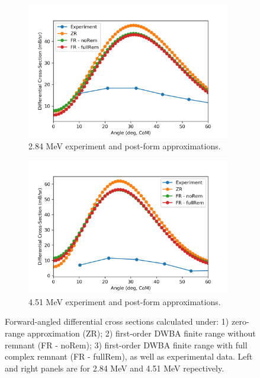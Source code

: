  \begin{figure}[h]
    \begin{subfigure}{0.5\textwidth}
		\centering
		\includegraphics[width=0.98\textwidth]{3MeVReactions.png}
		\caption{2.84 MeV experiment and post-form approximations. }
		\label{fig:3MeV}
	\end{subfigure}
        \begin{subfigure}{0.5\textwidth}
		\centering
		\includegraphics[width=0.98\textwidth]{5MeVReactions.png}
		\caption{4.51 MeV experiment and post-form approximations. }
		\label{fig:5MeV}
        \end{subfigure}
       \caption{Forward-angled differential cross sections calculated under: 1) zero-range approximation (ZR); 2) first-order DWBA finite range without remnant (FR - noRem); 3) first-order DWBA finite range with full complex remnant (FR - fullRem), as well as experimental data. 
        	Left and right panels are for 2.84 MeV and 4.51 MeV repectively.}
        \label{fig:post}
  \end{figure}

